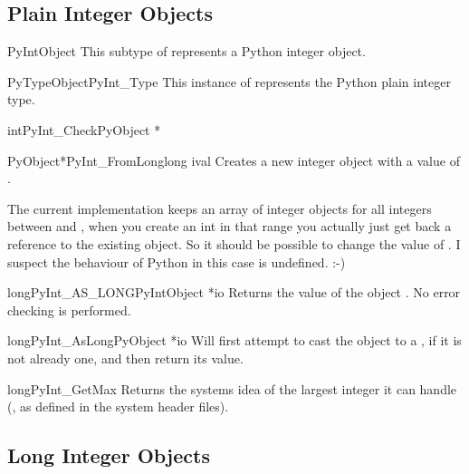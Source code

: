 \documentclass{manual}
\begin{document}
\subsection{Plain Integer Objects \label{intObjects}}

\begin{ctypedesc}{PyIntObject}
This subtype of  represents a Python integer object.
\end{ctypedesc}

\begin{cvardesc}{PyTypeObject}{PyInt_Type}
This instance of  represents the Python plain 
integer type.
\end{cvardesc}

\begin{cfuncdesc}{int}{PyInt_Check}{PyObject *}

\end{cfuncdesc}

\begin{cfuncdesc}{PyObject*}{PyInt_FromLong}{long ival}
Creates a new integer object with a value of .

The current implementation keeps an array of integer objects for all
integers between  and , when you create an int in
that range you actually just get back a reference to the existing
object. So it should be possible to change the value of . I
suspect the behaviour of Python in this case is undefined. :-)
\end{cfuncdesc}

\begin{cfuncdesc}{long}{PyInt_AS_LONG}{PyIntObject *io}
Returns the value of the object .  No error checking is
performed.
\end{cfuncdesc}

\begin{cfuncdesc}{long}{PyInt_AsLong}{PyObject *io}
Will first attempt to cast the object to a , if
it is not already one, and then return its value.
\end{cfuncdesc}

\begin{cfuncdesc}{long}{PyInt_GetMax}{}
Returns the systems idea of the largest integer it can handle
(, as defined in the system header files).
\end{cfuncdesc}


\subsection{Long Integer Objects \label{longObjects}}
\end{document}
